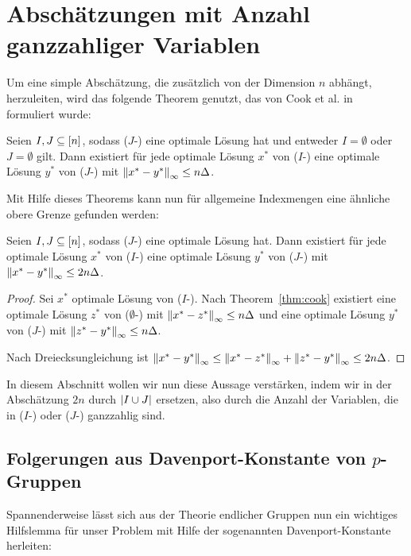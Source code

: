 
\section{Abschätzungen mit Anzahl ganzzahliger Variablen}

Um eine simple Abschätzung, die zusätzlich von der Dimension $n$ abhängt, herzuleiten, wird das folgende Theorem genutzt, das von Cook et al. in~\cite[Theorem 1 und Bemerkung 1]{Cook1986} formuliert wurde:

\begin{theorem}[Cook et al., 1986]\label{thm:cook}
	Seien $I, J\subseteq[n]$, sodass ($J$-\MIPR) eine optimale Lösung hat und entweder $I=\emptyset$ oder $J=\emptyset$ gilt.
	Dann existiert für jede optimale Lösung $x^*$ von ($I$-\MIPR) eine optimale Lösung $y^*$ von ($J$-\MIPR) mit $\left\lVert x^*-y^*\right\rVert_\infty\leq n\Delta$.
\end{theorem}

Mit Hilfe dieses Theorems kann nun für allgemeine Indexmengen eine ähnliche obere Grenze gefunden werden:
\begin{corollary}
	Seien $I,J\subseteq[n]$, sodass ($J$-\MIPR) eine optimale Lösung
	hat.
	Dann existiert für jede optimale Lösung $x^*$ von ($I$-\MIPR) eine optimale Lösung $y^*$ von ($J$-\MIPR) mit $\left\lVert x^*-y^*\right\rVert_\infty\leq2 n\Delta$.
\end{corollary}
\begin{proof}
	Sei $x^*$ optimale Lösung von ($I$-\MIPR).
	Nach Theorem~\ref{thm:cook} existiert eine optimale Lösung $z^*$ von ($\emptyset$-\MIPR) mit $\left\lVert x^*-z^*\right\rVert_\infty\leq n\Delta$ und eine optimale Lösung $y^*$ von \mbox{($J$-\MIPR)} mit $\left\lVert z^*-y^*\right\rVert_\infty\leq n\Delta$.
	
	Nach Dreiecksungleichung ist $\left\lVert x^*-y^*\right\rVert_\infty\leq\left\lVert x^*-z^*\right\rVert_\infty+\left\lVert z^*-y^*\right\rVert_\infty\leq 2 n\Delta$.
\end{proof}

In diesem Abschnitt wollen wir nun diese Aussage verstärken, indem wir in der Abschätzung $2 n$ durch $\lvert I\cup J \rvert$ ersetzen, also durch die Anzahl der Variablen, die in ($I$-\MIPR) oder \mbox{($J$-\MIPR)} ganzzahlig sind.

\subsection{Folgerungen aus Davenport-Konstante von $p$-Gruppen}

Spannenderweise lässt sich aus der Theorie endlicher Gruppen nun ein wichtiges Hilfslemma für unser Problem mit Hilfe der sogenannten Davenport-Konstante herleiten:

